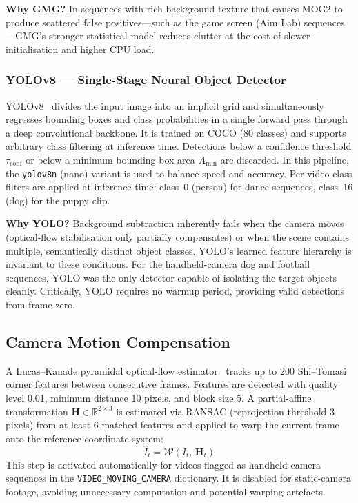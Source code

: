 \documentclass[10pt, conference, compsocconf]{IEEEtran}
\begin{document}
\textbf{Why GMG?} In sequences with rich background texture that
causes MOG2 to produce scattered false positives---such as the game
screen (Aim Lab) sequences---GMG's stronger statistical model reduces
clutter at the cost of slower initialisation and higher CPU load.

\subsubsection{YOLOv8 --- Single-Stage Neural Object Detector}
YOLOv8~\cite{jocher2023} divides the input image into an implicit
grid and simultaneously regresses bounding boxes and class
probabilities in a single forward pass through a deep convolutional
backbone. It is trained on COCO (80 classes) and supports arbitrary
class filtering at inference time. Detections below a confidence
threshold $\tau_\text{conf}$ or below a minimum bounding-box area
$A_\text{min}$ are discarded. In this pipeline, the \texttt{yolov8n}
(nano) variant is used to balance speed and accuracy. Per-video class
filters are applied at inference time: class~0 (person) for dance
sequences, class~16 (dog) for the puppy clip.

\textbf{Why YOLO?} Background subtraction inherently fails when the
camera moves (optical-flow stabilisation only partially compensates)
or when the scene contains multiple, semantically distinct object
classes. YOLO's learned feature hierarchy is invariant to these
conditions. For the handheld-camera dog and football sequences, YOLO
was the only detector capable of isolating the target objects cleanly.
Critically, YOLO requires no warmup period, providing valid detections
from frame zero.

\subsection{Camera Motion Compensation}
A Lucas--Kanade pyramidal optical-flow
estimator~\cite{lucas1981} tracks up to 200 Shi--Tomasi corner
features between consecutive frames. Features are detected with
quality level 0.01, minimum distance 10 pixels, and block size 5.
A partial-affine transformation
$\mathbf{H} \in \mathbb{R}^{2\times3}$ is estimated via RANSAC
(reprojection threshold 3 pixels) from at least 6 matched features
and applied to warp the current frame onto the reference coordinate
system:
\begin{equation}
  \hat{I}_t = \mathcal{W}(I_t,\, \mathbf{H}_t)
\end{equation}
This step is activated automatically for videos flagged as
handheld-camera sequences in the \texttt{VIDEO\_MOVING\_CAMERA}
dictionary. It is disabled for static-camera footage, avoiding
unnecessary computation and potential warping artefacts.
\end{document}
